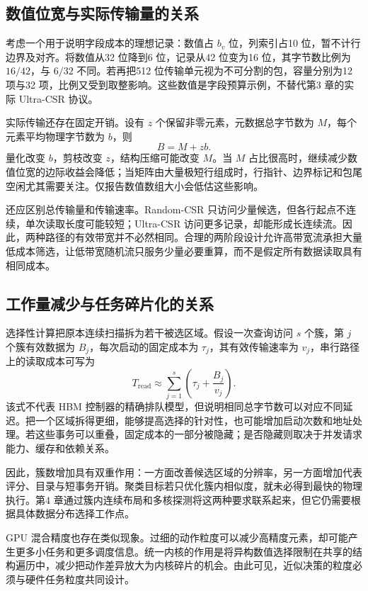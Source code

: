 \subsection{数值位宽与实际传输量的关系}
考虑一个用于说明字段成本的理想记录：数值占 $b_v$ 位，列索引占10 位，暂不计行边界及对齐。将数值从32 位降到6 位，记录从42 位变为16 位，其字节数比例为 $16/42$，与 $6/32$ 不同。若再把512 位传输单元视为不可分割的包，容量分别为12 项与32 项，比例又受到取整影响。这些数值是字段预算示例，不替代第3 章的实际 Ultra-CSR 协议。

实际传输还存在固定开销。设有 $z$ 个保留非零元素，元数据总字节数为 $M$，每个元素平均物理字节数为 $b$，则
\begin{equation}
 B=M+zb.
\end{equation}
量化改变 $b$，剪枝改变 $z$，结构压缩可能改变 $M$。当 $M$ 占比很高时，继续减少数值位宽的边际收益会降低；当矩阵由大量极短行组成时，行指针、边界标记和包尾空闲尤其需要关注。仅报告数值数组大小会低估这些影响。

还应区别总传输量和传输速率。Random-CSR 只访问少量候选，但各行起点不连续，单次读取长度可能较短；Ultra-CSR 访问更多记录，却能形成长连续流。因此，两种路径的有效带宽并不必然相同。合理的两阶段设计允许高带宽流承担大量低成本筛选，让低带宽随机流只服务少量必要重算，而不是假定所有数据读取具有相同成本。

\subsection{工作量减少与任务碎片化的关系}
选择性计算把原本连续扫描拆为若干被选区域。假设一次查询访问 $s$ 个簇，第 $j$ 个簇有效数据为 $B_j$，每次启动的固定成本为 $\tau_j$，其有效传输速率为 $v_j$，串行路径上的读取成本可写为
\begin{equation}
 T_{\mathrm{read}}\approx\sum_{j=1}^{s}\left(\tau_j+\frac{B_j}{v_j}\right).
\end{equation}
该式不代表 HBM 控制器的精确排队模型，但说明相同总字节数可以对应不同延迟。把一个区域拆得更细，能够提高选择的针对性，也可能增加启动次数和地址处理。若这些事务可以重叠，固定成本的一部分被隐藏；是否隐藏则取决于并发请求能力、缓存和依赖关系。

因此，簇数增加具有双重作用：一方面改善候选区域的分辨率，另一方面增加代表评分、目录与短事务开销。聚类目标若只优化簇内相似度，就未必得到最快的物理执行。第4 章通过簇内连续布局和多核探测将这两种要求联系起来，但它仍需要根据具体数据分布选择工作点。

GPU 混合精度也存在类似现象。过细的动作粒度可以减少高精度元素，却可能产生更多小任务和更多调度信息。统一内核的作用是将异构数值选择限制在共享的结构遍历中，减少把动作差异放大为内核碎片的机会。由此可见，近似决策的粒度必须与硬件任务粒度共同设计。

